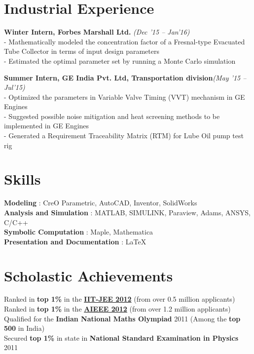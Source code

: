 \documentclass[margin,line]{res}
\begin{document}
\begin{resume}
\section {\sc Industrial Experience}
\textbullet\hspace{0.005cm} {\bf Winter Intern, Forbes Marshall Ltd. }\hfill {\em (Dec '15 -- Jan'16)}\\
- Mathematically modeled the concentration factor of a Fresnal-type Evacuated Tube Collector in terms of input design parameters\\
- Estimated the optimal parameter set by running a Monte Carlo simulation

\textbullet\hspace{0.005cm} {\bf Summer Intern, GE India Pvt. Ltd, Transportation division}\hfill {\em (May '15 -- Jul'15)}\\
- Optimized the parameters in Variable Valve Timing (VVT) mechanism in GE Engines\\
- Suggested possible noise mitigation and heat screening methods to be implemented in GE Engines\\
- Generated a Requirement Traceability Matrix (RTM) for Lube Oil pump test rig

\section {\sc Skills}
\textbullet\hspace{0.005cm} {\bf Modeling} : CreO Parametric, AutoCAD, Inventor, SolidWorks \\
\textbullet\hspace{0.005cm} {\bf Analysis and Simulation} : MATLAB, SIMULINK, Paraview, Adams, ANSYS, C/C++\\
\textbullet\hspace{0.005cm} {\bf Symbolic Computation} : Maple, Mathematica\\
\textbullet\hspace{0.005cm} {\bf Presentation and Documentation} : \LaTeX 

\section{\sc Scholastic Achievements}
\textbullet\hspace{0.005cm} Ranked in {\bf top 1\%} in the \href{https://en.wikipedia.org/wiki/Indian_Institute_of_Technology_Joint_Entrance_Examination}{\bf IIT-JEE 2012} (from over 0.5 million applicants)\\
\textbullet\hspace{0.005cm} Ranked in {\bf top 1\%} in the \href{https://en.wikipedia.org/wiki/All_India_Engineering_Entrance_Examination}{\bf AIEEE 2012} (from over 1.2 million applicants)\\
\textbullet\hspace{0.005cm} Qualified for the {\bf Indian National Maths Olympiad} 2011 (Among the {\bf top 500} in India)\\
\textbullet\hspace{0.005cm} Secured {\bf top 1\%} in state in {\bf National Standard Examination in Physics} 2011


\end{resume}
\end{document}
